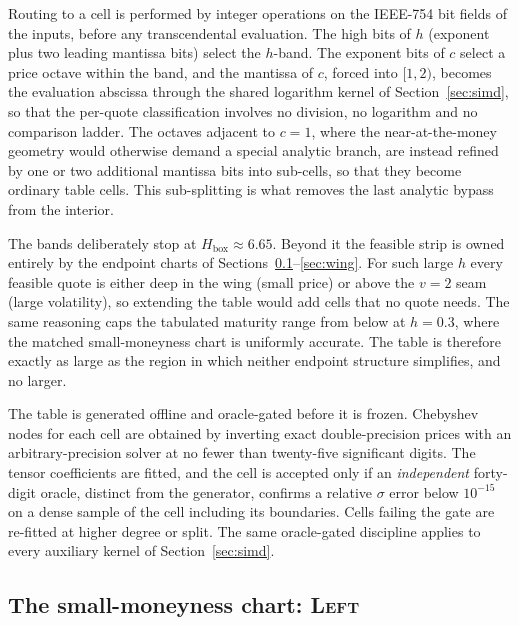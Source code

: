 \documentclass[11pt]{article}
\newcommand{\rtag}[1]{{\normalfont\scshape #1}}
\begin{document}
Routing to a cell is performed by integer operations on the IEEE-754 bit fields of the inputs, before any transcendental evaluation. The high bits of $h$ (exponent plus two leading mantissa bits) select the $h$-band. The exponent bits of $c$ select a price octave within the band, and the mantissa of $c$, forced into $[1,2)$, becomes the evaluation abscissa through the shared logarithm kernel of Section~\ref{sec:simd}, so that the per-quote classification involves no division, no logarithm and no comparison ladder. The octaves adjacent to $c=1$, where the near-at-the-money geometry would otherwise demand a special analytic branch, are instead refined by one or two additional mantissa bits into sub-cells, so that they become ordinary table cells. This sub-splitting is what removes the last analytic bypass from the interior.

The bands deliberately stop at $H_{\mathrm{box}}\approx6.65$. Beyond it the feasible strip is owned entirely by the endpoint charts of Sections~\ref{sec:left}--\ref{sec:wing}. For such large $h$ every feasible quote is either deep in the wing (small price) or above the $v=2$ seam (large volatility), so extending the table would add cells that no quote needs. The same reasoning caps the tabulated maturity range from below at $h=0.3$, where the matched small-moneyness chart is uniformly accurate. The table is therefore exactly as large as the region in which neither endpoint structure simplifies, and no larger.

The table is generated offline and oracle-gated before it is frozen. Chebyshev nodes for each cell are obtained by inverting exact double-precision prices with an arbitrary-precision solver at no fewer than twenty-five significant digits. The tensor coefficients are fitted, and the cell is accepted only if an \emph{independent} forty-digit oracle, distinct from the generator, confirms a relative $\sigma$ error below $10^{-15}$ on a dense sample of the cell including its boundaries. Cells failing the gate are re-fitted at higher degree or split. The same oracle-gated discipline applies to every auxiliary kernel of Section~\ref{sec:simd}.

\subsection{The small-moneyness chart: \rtag{Left}}
\label{sec:left}
\end{document}
